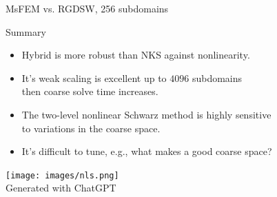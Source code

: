\begin{frame}{MsFEM vs. RGDSW, 256 subdomains}
	\begin{figure}
		\centering
		
		\label{fig:msfem-vs-rgdsw}
	\end{figure}
\end{frame}

\begin{frame}{Summary}
	\begin{itemize}
		\item Hybrid is more robust than NKS against nonlinearity.
		\item It's weak scaling is excellent up to $4096$ subdomains\\then coarse solve time increases. %
		\item The two-level nonlinear Schwarz method is highly sensitive\\to variations in the coarse space.
		\item It's difficult to tune, e.g., what makes a good coarse space?%
	\end{itemize}
	\vspace{2mm}
	\begin{center}
		\texttt{[image: images/nls.png]}\\
		{\tiny \vspace{-2mm}\hspace{-4.6cm}Generated with ChatGPT}
	\end{center}
\end{frame}
